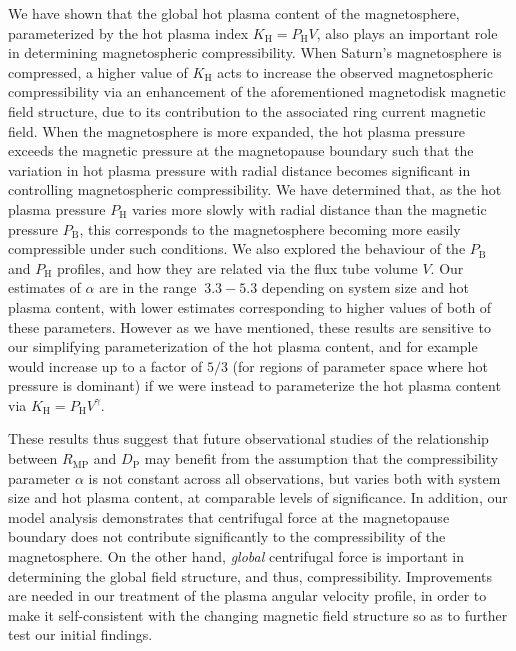 We have shown that the global hot plasma content of the magnetosphere, parameterized by the hot plasma index $K_\mathrm{H}=P_\mathrm{H}V$, also plays an important role in determining magnetospheric compressibility. When Saturn's magnetosphere is compressed, a higher value of $K_\mathrm{H}$ acts to increase the observed magnetospheric compressibility via an enhancement of the aforementioned magnetodisk magnetic field structure, due to its contribution to the associated ring current magnetic field. When the magnetosphere is more expanded, the hot plasma pressure exceeds the magnetic pressure at the magnetopause boundary such that the variation in hot plasma pressure with radial distance becomes significant in controlling magnetospheric compressibility. We have determined that, as the hot plasma pressure $P_\mathrm{H}$ varies more slowly with radial distance than the magnetic pressure $P_\mathrm{B}$, this corresponds to the magnetosphere becoming more easily compressible under such conditions. We also explored the behaviour of the $P_\mathrm{B}$ and $P_\mathrm{H}$ profiles, and how they are related via the flux tube volume $V$. Our estimates of $\alpha$ are in the range ${~}3.3-5.3$ depending on system size and hot plasma content, with lower estimates corresponding to higher values of both of these parameters. However as we have mentioned, these results are sensitive to our simplifying parameterization of the hot plasma content, and for example would increase up to a factor of $5/3$ (for regions of parameter space where hot pressure is dominant) if we were instead to parameterize the hot plasma content via $K_\mathrm{H} = P_\mathrm{H}V^\gamma$. 

These results thus suggest that future observational studies of the relationship between $R_\mathrm{MP}$ and $D_\mathrm{P}$ may benefit from the assumption that the compressibility parameter $\alpha$ is not constant across all observations, but varies both with system size and hot plasma content, at comparable levels of significance. In addition, our model analysis demonstrates that centrifugal force at the magnetopause boundary does not contribute significantly to the compressibility of the magnetosphere. On the other hand, \textit{global} centrifugal force is important in determining the global field structure, and thus, compressibility. Improvements are needed in our treatment of the plasma angular velocity profile, in order to make it self-consistent with the changing magnetic field structure so as to further test our initial findings.

